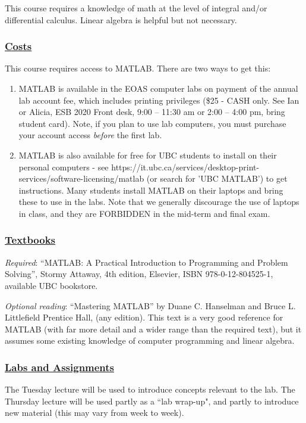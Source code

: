 \documentclass[12pt]{article}
\renewcommand{\section}[1]{\vspace{0pt}\subsubsection*{\underline{\large #1}}\vspace{-10pt}}
\begin{document}
This course requires a knowledge of math at the level of integral and/or
differential calculus. Linear algebra is helpful but not necessary.

\section{Costs}
This course requires access to MATLAB. There are two ways to get this:
\begin{enumerate}
\item MATLAB is available  in the EOAS computer labs on payment of the annual lab
account fee, which includes printing privileges (\$25 - CASH only.  See Ian or 
Alicia, ESB 2020 Front desk, 9:00 -- 11:30 am or 2:00 -- 4:00 pm, bring student card). 
 Note, if you
plan to use lab computers, you must purchase your account access \emph{before} the first lab.

\item MATLAB is also available for free for UBC students to install on their personal computers - see https://it.ubc.ca/services/desktop-print-services/software-licensing/matlab
(or search for 'UBC MATLAB')  to get instructions.  Many students install MATLAB on their laptops and bring
these to use in the labs.  Note that we generally discourage the use of laptops in class, and they are FORBIDDEN in 
the mid-term and final exam. 
 \end{enumerate} 
  
 \newpage
\section{Textbooks}

{\em Required}: ``MATLAB: A Practical Introduction to Programming and Problem Solving'', Stormy Attaway, 4th edition, Elsevier, ISBN 978-0-12-804525-1, available UBC bookstore.


{\em Optional reading}: ``Mastering MATLAB'' by Duane C. Hanselman and 
Bruce L. Littlefield Prentice Hall, (any edition). This text is
a very good reference for MATLAB (with far more detail and a wider range
than the required text), but it assumes some existing knowledge of
computer programming and linear algebra.

\section{Labs and Assignments}

The Tuesday lecture will be used to introduce concepts relevant to the lab.
The Thursday lecture will be used partly as a ``lab wrap-up", and partly
to introduce new material (this may vary from week to week). 
\end{document}
